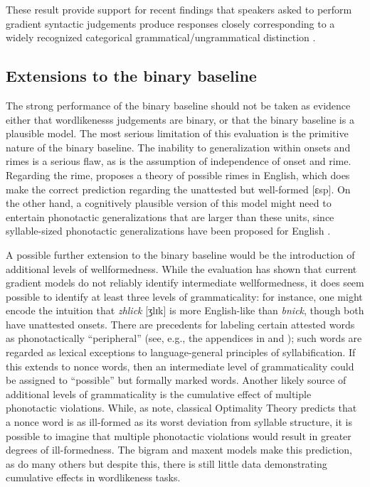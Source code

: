 These result provide support for recent findings that speakers asked to perform gradient syntactic judgements produce responses closely corresponding to a widely recognized categorical grammatical/ungrammatical distinction \citep{Sprouse2007}.

\subsection{Extensions to the binary baseline}

The strong performance of the binary baseline should not be taken as evidence either that wordlikenesss judgements are binary, or that the binary baseline is a plausible model. The most serious limitation of this evaluation is the primitive nature of the binary baseline. The inability to generalization within onsets and rimes is a serious flaw, as is the assumption of independence of onset and rime. Regarding the rime, \citet{Borowsky1989} proposes a theory of possible rimes in English, which does make the correct prediction regarding the unattested but well-formed [ɛsp]. On the other hand, a cognitively plausible version of this model might need to entertain phonotactic generalizations that are larger than these units, since syllable-sized phonotactic generalizations have been proposed for English \citep[e.g.,][]{Berkley1994a,Berkley1994b,Coetzee2008b,Fudge1969}. 

A possible further extension to the binary baseline would be the introduction of additional levels of wellformedness. While the evaluation has shown that current gradient models do not reliably identify intermediate wellformedness, it does seem possible to identify at least three levels of grammaticality: for instance, one might encode the intuition that \emph{zhlick} [ʒlɪk] is more English-like than \emph{bnick}, though both have unattested onsets. There are precedents for labeling certain attested words as phonotactically ``peripheral'' (see, e.g., the appendices in \citealt{Myers1987} and \citealt{Borowsky1989}); such words are regarded as lexical exceptions to language-general principles of syllabification. If this extends to nonce words, then an intermediate level of grammaticality could be assigned to ``possible'' but formally marked words. Another likely source of additional levels of grammaticality is the cumulative effect of multiple phonotactic violations. While, as \citet{Coleman1997} note, classical Optimality Theory predicts that a nonce word is as ill-formed as its worst deviation from syllable structure, it is possible to imagine that multiple phonotactic violations would result in greater degrees of ill-formedness. The bigram and maxent models make this prediction, as do many others \citep[e.g.,][]{Legendre1990,Levelt2000,Albright2008,Anttila2008a,Pater2009b} but despite this, there is still little data demonstrating cumulative effects in wordlikeness tasks.

